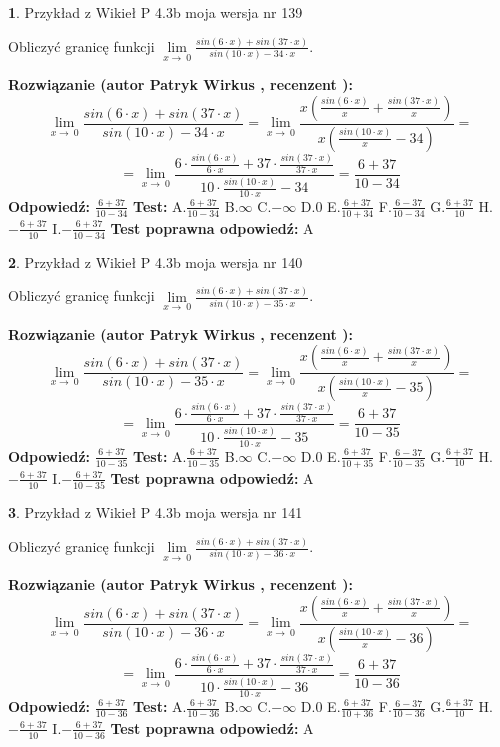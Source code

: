 \documentclass[12pt, a4paper]{article}
\theoremstyle{definition} %
\newtheorem{zad}{}
\newcommand{\zadStart}[1]{\begin{zad}#1\newline}
\newcommand{\zadStop}{\end{zad}}
\newcommand{\rozwStart}[2]{\noindent \textbf{Rozwiązanie (autor #1 , recenzent #2): }\newline}
\newcommand{\rozwStop}{\newline}
\newcommand{\odpStart}{\noindent \textbf{Odpowiedź:}\newline}
\newcommand{\odpStop}{\newline}
\newcommand{\testStart}{\noindent \textbf{Test:}\newline}
\newcommand{\testStop}{\newline}
\newcommand{\kluczStart}{\noindent \textbf{Test poprawna odpowiedź:}\newline}
\newcommand{\kluczStop}{\newline}
\begin{document}
\zadStart{Przykład z Wikieł P 4.3b moja wersja nr 139}


Obliczyć granicę funkcji $\lim\limits_{x\to\ 0}\frac{sin(6 \cdot x)+sin(37 \cdot x)}{sin(10 \cdot x)-34 \cdot x}$.
\zadStop
\rozwStart{Patryk Wirkus}{}
$$\lim\limits_{x\to\ 0}\frac{sin(6 \cdot x)+sin(37 \cdot x)}{sin(10 \cdot x)-34 \cdot x}=\lim\limits_{x\to\ 0}\frac{x(\frac{sin(6 \cdot x)}{x}+\frac{sin(37 \cdot x)}{x})}{x(\frac{sin(10 \cdot x)}{x}-34)}=$$
$$=\lim\limits_{x\to\ 0}\frac{6 \cdot \frac{sin(6 \cdot x)}{6 \cdot x}+37 \cdot \frac{sin(37 \cdot x)}{37 \cdot x}}{10 \cdot \frac{sin(10 \cdot x)}{10 \cdot x}-34}=\frac{6+37}{10-34}$$
\rozwStop
\odpStart
$\frac{6+37}{10-34}$
\odpStop
\testStart
A.$\frac{6+37}{10-34}$
B.$\infty$
C.$-\infty$
D.$0$
E.$\frac{6+37}{10+34}$
F.$\frac{6-37}{10-34}$
G.$\frac{6+37}{10}$
H.$-\frac{6+37}{10}$
I.$-\frac{6+37}{10-34}$
\testStop
\kluczStart
A
\kluczStop



\zadStart{Przykład z Wikieł P 4.3b moja wersja nr 140}


Obliczyć granicę funkcji $\lim\limits_{x\to\ 0}\frac{sin(6 \cdot x)+sin(37 \cdot x)}{sin(10 \cdot x)-35 \cdot x}$.
\zadStop
\rozwStart{Patryk Wirkus}{}
$$\lim\limits_{x\to\ 0}\frac{sin(6 \cdot x)+sin(37 \cdot x)}{sin(10 \cdot x)-35 \cdot x}=\lim\limits_{x\to\ 0}\frac{x(\frac{sin(6 \cdot x)}{x}+\frac{sin(37 \cdot x)}{x})}{x(\frac{sin(10 \cdot x)}{x}-35)}=$$
$$=\lim\limits_{x\to\ 0}\frac{6 \cdot \frac{sin(6 \cdot x)}{6 \cdot x}+37 \cdot \frac{sin(37 \cdot x)}{37 \cdot x}}{10 \cdot \frac{sin(10 \cdot x)}{10 \cdot x}-35}=\frac{6+37}{10-35}$$
\rozwStop
\odpStart
$\frac{6+37}{10-35}$
\odpStop
\testStart
A.$\frac{6+37}{10-35}$
B.$\infty$
C.$-\infty$
D.$0$
E.$\frac{6+37}{10+35}$
F.$\frac{6-37}{10-35}$
G.$\frac{6+37}{10}$
H.$-\frac{6+37}{10}$
I.$-\frac{6+37}{10-35}$
\testStop
\kluczStart
A
\kluczStop



\zadStart{Przykład z Wikieł P 4.3b moja wersja nr 141}


Obliczyć granicę funkcji $\lim\limits_{x\to\ 0}\frac{sin(6 \cdot x)+sin(37 \cdot x)}{sin(10 \cdot x)-36 \cdot x}$.
\zadStop
\rozwStart{Patryk Wirkus}{}
$$\lim\limits_{x\to\ 0}\frac{sin(6 \cdot x)+sin(37 \cdot x)}{sin(10 \cdot x)-36 \cdot x}=\lim\limits_{x\to\ 0}\frac{x(\frac{sin(6 \cdot x)}{x}+\frac{sin(37 \cdot x)}{x})}{x(\frac{sin(10 \cdot x)}{x}-36)}=$$
$$=\lim\limits_{x\to\ 0}\frac{6 \cdot \frac{sin(6 \cdot x)}{6 \cdot x}+37 \cdot \frac{sin(37 \cdot x)}{37 \cdot x}}{10 \cdot \frac{sin(10 \cdot x)}{10 \cdot x}-36}=\frac{6+37}{10-36}$$
\rozwStop
\odpStart
$\frac{6+37}{10-36}$
\odpStop
\testStart
A.$\frac{6+37}{10-36}$
B.$\infty$
C.$-\infty$
D.$0$
E.$\frac{6+37}{10+36}$
F.$\frac{6-37}{10-36}$
G.$\frac{6+37}{10}$
H.$-\frac{6+37}{10}$
I.$-\frac{6+37}{10-36}$
\testStop
\kluczStart
A
\kluczStop
\end{document}
